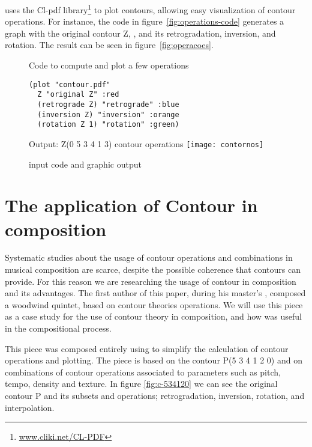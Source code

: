 \goiaba{} uses the Cl-pdf library\footnote{\url{www.cliki.net/CL-PDF}}
to plot contours, allowing easy visualization of contour operations.
For instance, the code in figure~\ref{fig:operations-code} generates a
graph with the original contour Z, , and its
retrogradation, inversion, and rotation. The result can be seen in
figure~\ref{fig:operacoes}.

\begin{figure}
  \centering
  \begin{SubFloat}{\label{fig:operations-code}Code to compute and plot a few operations}%
    \begin{minipage}[b]{0.5\linewidth}%
\begin{verbatim}
(plot "contour.pdf"
  Z "original Z" :red
  (retrograde Z) "retrograde" :blue
  (inversion Z) "inversion" :orange
  (rotation Z 1) "rotation" :green)
\end{verbatim}%
    \end{minipage}%
  \end{SubFloat}
  \hspace{1.5cm}%
  \begin{SubFloat}{\label{fig:operacoes}Output: Z(0 5 3 4 1 3) contour operations}%
    \texttt{[image: contornos]}
  \end{SubFloat}%
  \caption{\goiaba{} input code and graphic output}
  \label{fig:label}
\end{figure}

\section{The application of Contour in composition}
\label{sec:cont-appl-comp}

Systematic studies about the usage of contour operations and
combinations in musical composition are scarce, despite the possible
coherence that contours can provide. For this reason we are
researching the usage of contour in composition and its advantages.
The first author of this paper, during his master's
\cite{sampaio08:em}, composed a woodwind quintet,
based on contour theories operations. We will use this piece as a case
study for the use of contour theory in composition, and how \goiaba{}
was useful in the compositional process.

This piece
was composed entirely using \goiaba{} to simplify the calculation of
contour operations and plotting. The piece is based on the contour P(5
3 4 1 2 0) and on combinations of contour operations associated to
parameters such as pitch, tempo, density and texture. In figure
\ref{fig:c-534120} we can see the original contour P and its subsets
and operations; retrogradation, inversion, rotation, and
interpolation.

